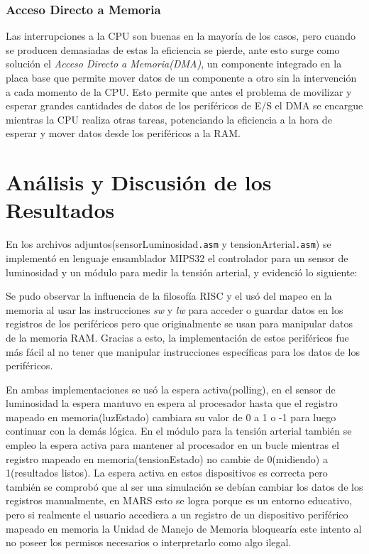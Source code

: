 \documentclass[12pt, a4paper]{article}
\begin{document}
\subsubsection{Acceso Directo a Memoria}
Las interrupciones a la CPU son buenas en la mayoría de los casos, pero cuando se producen demasiadas de estas la eficiencia se pierde, ante esto surge como solución el \textit{Acceso Directo a Memoria(DMA)}, un componente integrado en la placa base que permite mover datos de un componente a otro sin la intervención a cada momento de la CPU. Esto permite que antes el problema de movilizar y esperar grandes cantidades de datos de los periféricos de E/S el DMA se encargue mientras la CPU realiza otras tareas, potenciando la eficiencia a la hora de esperar y mover datos desde los periféricos a la RAM.
\section{Análisis y Discusión de los Resultados}
En los archivos adjuntos(sensorLuminosidad\texttt{.asm} y tensionArterial\texttt{.asm}) se implementó en lenguaje ensamblador MIPS32 el controlador para un sensor de luminosidad y un módulo para medir la tensión arterial, y evidenció lo siguiente:

Se pudo observar la influencia de la filosofía RISC y el usó del mapeo en la memoria al usar las instrucciones \textit{sw} y \textit{lw} para acceder o guardar datos en los registros de los periféricos pero que originalmente se usan para manipular datos de la memoria RAM. Gracias a esto, la implementación de estos periféricos fue más fácil al no tener que manipular instrucciones específicas para los datos de los periféricos.

En ambas implementaciones se usó la espera activa(polling), en el sensor de luminosidad la espera mantuvo en espera al procesador hasta que el registro mapeado en memoria(luzEstado) cambiara su valor de 0 a 1 o -1 para luego continuar con la demás lógica. En el módulo para la tensión arterial también se empleo la espera activa para mantener al procesador en un bucle mientras el registro mapeado en memoria(tensionEstado) no cambie de 0(midiendo) a 1(resultados listos). La espera activa en estos dispositivos es correcta pero también se comprobó que al ser una simulación se debían cambiar los datos de los registros manualmente, en MARS esto se logra porque es un entorno educativo, pero si realmente el usuario accediera a un registro de un dispositivo periférico mapeado en memoria la Unidad de Manejo de Memoria bloquearía este intento al no poseer los permisos necesarios o interpretarlo como algo ilegal.
\end{document}
